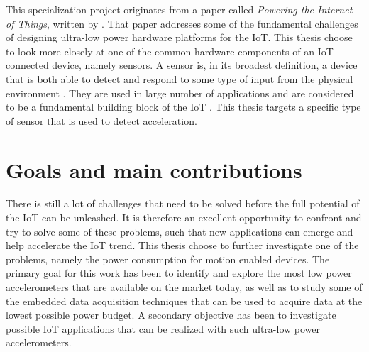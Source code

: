 
This specialization project originates from a paper called \textit{Powering the Internet of Things}, written by \cite{jayakumar14}. That paper addresses some of the fundamental challenges of designing ultra-low power hardware platforms for the IoT. This thesis choose to look more closely at one of the common hardware components of an IoT connected device, namely sensors. A sensor is, in its broadest definition, a device that is both able to detect and respond to some type of input from the physical environment \cite{wigmore12}. They are used in large number of applications and are considered to be a fundamental building block of the IoT \cite{jayakumar14}. This thesis targets a specific type of sensor that is used to detect acceleration. 





\section{Goals and main contributions}

There is still a lot of challenges that need to be solved before the full potential of the IoT can be unleashed. It is therefore an excellent opportunity to confront and try to solve some of these problems, such that new applications can emerge and help accelerate the IoT trend. This thesis choose to further investigate one of the problems, namely the power consumption for motion enabled devices. The primary goal for this work has been to identify and explore the most low power accelerometers that are available on the market today, as well as to study some of the embedded data acquisition techniques that can be used to acquire data at the lowest possible power budget. A secondary objective has been to investigate possible IoT applications that can be realized with such ultra-low power accelerometers.


